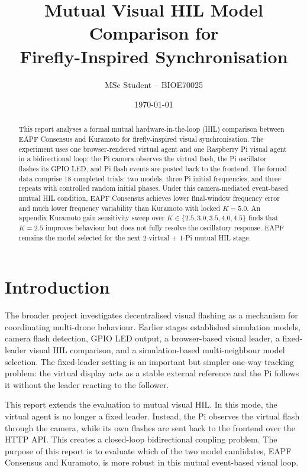 \documentclass[11pt,a4paper]{article}
\title{Mutual Visual HIL Model Comparison for\\Firefly-Inspired Synchronisation}
\author{MSc Student -- BIOE70025}
\date{\today}
\begin{document}
\maketitle

\begin{abstract}
This report analyses a formal mutual hardware-in-the-loop (HIL)
comparison between EAPF Consensus and Kuramoto for firefly-inspired visual
synchronisation. The experiment uses one browser-rendered virtual agent and
one Raspberry Pi visual agent in a bidirectional loop: the Pi camera observes
the virtual flash, the Pi oscillator flashes its GPIO LED, and Pi flash events
are posted back to the frontend. The formal data comprise 18 completed trials:
two models, three Pi initial frequencies, and three repeats with controlled
random initial phases. Under this camera-mediated event-based mutual HIL
condition, EAPF Consensus achieves lower final-window frequency error and much
lower frequency variability than Kuramoto with locked $K=5.0$.
An appendix Kuramoto gain sensitivity sweep over $K \in
\{2.5, 3.0, 3.5, 4.0, 4.5\}$ finds that $K=2.5$ improves behaviour but does
not fully resolve the oscillatory response. EAPF remains the model selected
for the next 2-virtual + 1-Pi mutual HIL stage.
\end{abstract}

\FloatBarrier

\section{Introduction}

The broader project investigates decentralised visual flashing as a mechanism
for coordinating multi-drone behaviour. Earlier stages established simulation
models, camera flash detection, GPIO LED output, a browser-based visual leader,
a fixed-leader visual HIL comparison, and a simulation-based multi-neighbour
model selection. The fixed-leader setting is an important but simpler one-way
tracking problem: the virtual display acts as a stable external reference and
the Pi follows it without the leader reacting to the follower.

This report extends the evaluation to mutual visual HIL. In this mode, the
virtual agent is no longer a fixed leader. Instead, the Pi observes the virtual
flash through the camera, while its own flashes are sent back to the frontend
over the HTTP API. This creates a closed-loop bidirectional coupling problem.
The purpose of this report is to evaluate which of the two model candidates,
EAPF Consensus and Kuramoto, is more robust in this mutual event-based visual
loop.
\end{document}
